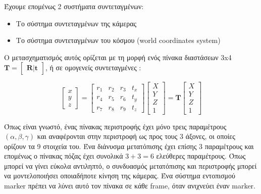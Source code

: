 Έχουμε επομένως 2 συστήματα συντεταγμένων:

\begin{itemize}
\item Το σύστημα συντεταγμένων της κάμερας 
\item Το σύστημα συντεταγμένων του κόσμου (world coordinates system)
\end{itemize}



Ο μετασχηματισμός αυτός ορίζεται με τη μορφή ενός πίνακα διαστάσεων 3x4 $\mathbf{T}=\begin{bmatrix}\mathbf{R}\!|\!\mathbf{t}\end{bmatrix}$, ή σε ομογενείς συντεταγμένες :

\begin{equation}
\begin{bmatrix}
x \\ y \\ z
\end{bmatrix}
=
\begin{bmatrix}
r_{1} & r_{2} & r_{3} & t_{x}\\
r_{4} & r_{5} & r_{6} & t_{y}\\
r_{7} & r_{8} & r_{9} & t_{z}
\end{bmatrix}
\begin{bmatrix}
X\\
Y\\
Z\\
1
\end{bmatrix}
=\mathbf{T}\begin{bmatrix}
X\\
Y\\
Z\\
1
\end{bmatrix}
\end{equation}

Όπως είναι γνωστό, ένας πίνακας περιστροφής έχει μόνο τρεις παραμέτρους $(\alpha, \beta, \gamma)$ και αναφέρονται στην περιστροφή ως προς τους 3 άξονες, οι οποίες ορίζουν τα 9 στοιχεία του. Ένα διάνυσμα μετατόπισης έχει επίσης 3 παραμέτρους και επομένως ο πίνακας πόζας έχει συνολικά $3+3=6$ ελεύθερες παραμέτρους. Όπως μπορεί να γίνει εύκολα αντιληπτό, ο συνδυασμός μετατόπισης και περιστροφής μπορεί να μοντελοποιήσει οποιαδήποτε κίνηση της κάμερας. Ένα σύστημα εντοπισμού marker πρέπει να λύνει αυτό τον πίνακα σε κάθε frame, όταν ανιχνεύει έναν marker.







